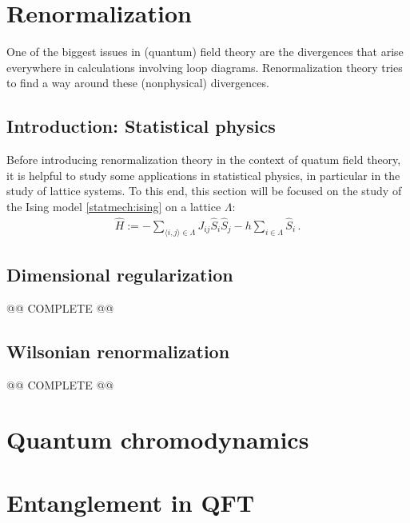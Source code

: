 \section{Renormalization}

    One of the biggest issues in (quantum) field theory are the divergences that arise everywhere in calculations involving loop diagrams. Renormalization theory tries to find a way around these (nonphysical) divergences.

\subsection{Introduction: Statistical physics}

    Before introducing renormalization theory in the context of quatum field theory, it is helpful to study some applications in statistical physics, in particular in the study of lattice systems. To this end, this section will be focused on the study of the Ising model \ref{statmech:ising} on a lattice $\Lambda$:
    \begin{gather}
        \hat{H} := -\sum_{\langle i,j \rangle\in\Lambda}J_{ij}\hat{S}_i\hat{S}_j-h\sum_{i\in\Lambda}\hat{S}_i\,.
    \end{gather}

\subsection{Dimensional regularization}

    @@ COMPLETE @@

\subsection{Wilsonian renormalization}

    @@ COMPLETE @@

\section{Quantum chromodynamics}


\section{Entanglement in QFT}

